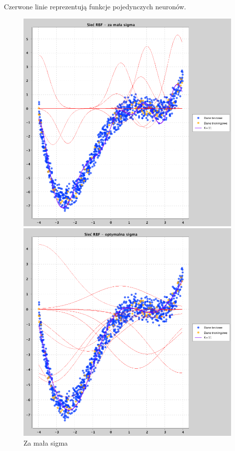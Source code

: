 \documentclass[a4paper, portrait,11pt]{article}
\begin{document}
Czerwone linie reprezentują funkcje pojedynczych neuronów.
\begin{figure}[!htb]
  \begin{minipage}{0.33\textwidth}
    \centering
    \includegraphics[width=1\linewidth]{../data/approximation3/2/small.png}
    \caption{Za mała sigma}
  \end{minipage}
  \begin{minipage}{0.33\textwidth}
    \centering
    \includegraphics[width=1\linewidth]{../data/approximation3/2/optimal.png}

\end{minipage}
\end{figure}
\end{document}
